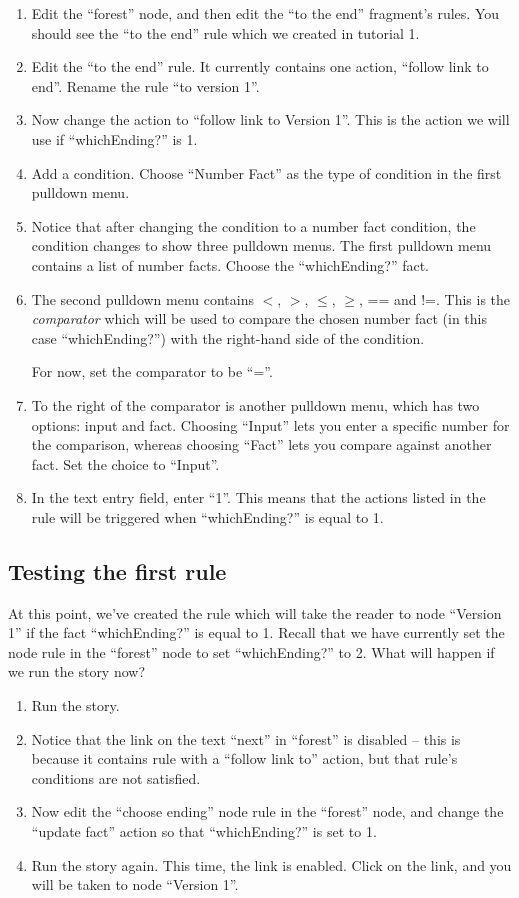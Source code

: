 \documentclass{article}
\begin{document}
\begin{enumerate}
    \item Edit the ``forest'' node, and then edit the ``to the end''  fragment's rules. You should see the ``to the end'' rule which we created in tutorial 1.
    \item Edit the ``to the end'' rule. It currently contains one action, ``follow link to end''. Rename the rule ``to version 1''.
    \item Now change the action to ``follow link to Version 1''. This is the action we will use if ``whichEnding?'' is 1.
    \item Add a condition. Choose ``Number Fact'' as the type of condition in the first pulldown menu.
    \item Notice that after changing the condition to a number fact 
    condition, the condition changes to show three pulldown menus. The first pulldown menu contains a list of number facts. Choose the ``whichEnding?'' fact.
    \item The second pulldown menu contains $<$, $>$, $\le$, $\ge$, == and !=. This is the \textit{comparator} which will be used to compare the chosen number fact (in this case ``whichEnding?'') with the right-hand side of the condition.
    
For now, set the comparator to be ``=''.
    \item To the right of the comparator is another pulldown menu, which has two options: input and fact. Choosing ``Input'' lets you enter a specific number for the comparison, whereas choosing ``Fact'' lets you compare against another fact. Set the choice to ``Input''.
    \item In the text entry field, enter ``1''. This means that the actions listed in the rule will be triggered when ``whichEnding?'' is equal to 1.
\end{enumerate}

\subsection{Testing the first rule}

At this point, we've created the rule which will take the reader to node ``Version 1'' if the fact ``whichEnding?'' is equal to 1. Recall that we have currently set the node rule in the ``forest'' node to set ``whichEnding?'' to 2. What will happen if we run the story now?

\begin{enumerate}
    \item Run the story.
    \item Notice that the link on the text ``next'' in ``forest'' is disabled -- this is because it contains rule with a ``follow link to'' action, but that rule's conditions are not satisfied.
    \item Now edit the ``choose ending'' node rule in the ``forest'' node, and change the ``update fact'' action so that ``whichEnding?'' is set to 1.
    \item Run the story again. This time, the link is enabled. Click on the link, and you will be taken to node ``Version 1''.
\end{enumerate}
\end{document}
